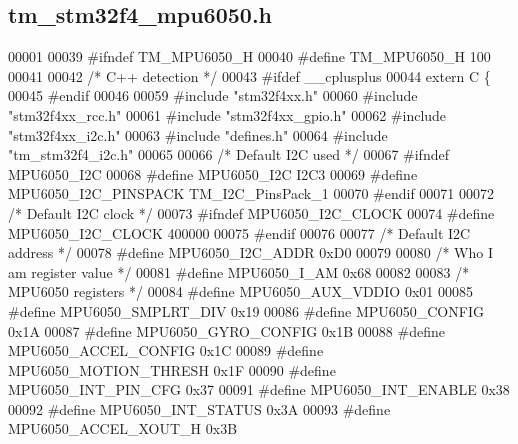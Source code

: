 \hypertarget{tm__stm32f4__mpu6050_8h_source}{}\subsection{tm\+\_\+stm32f4\+\_\+mpu6050.\+h}

\begin{DoxyCode}
00001 
00039 \textcolor{preprocessor}{#ifndef TM\_MPU6050\_H}
00040 \textcolor{preprocessor}{#define TM\_MPU6050\_H 100}
00041 
00042 \textcolor{comment}{/* C++ detection */}
00043 \textcolor{preprocessor}{#ifdef \_\_cplusplus}
00044 \textcolor{keyword}{extern} C \{
00045 \textcolor{preprocessor}{#endif}
00046 
00059 \textcolor{preprocessor}{#include "stm32f4xx.h"}
00060 \textcolor{preprocessor}{#include "stm32f4xx\_rcc.h"}
00061 \textcolor{preprocessor}{#include "stm32f4xx\_gpio.h"}
00062 \textcolor{preprocessor}{#include "stm32f4xx\_i2c.h"}
00063 \textcolor{preprocessor}{#include "defines.h"}
00064 \textcolor{preprocessor}{#include "tm\_stm32f4\_i2c.h"}
00065 
00066 \textcolor{comment}{/* Default I2C used */}
00067 \textcolor{preprocessor}{#ifndef MPU6050\_I2C}
00068 \textcolor{preprocessor}{#define MPU6050\_I2C                 I2C3}
00069 \textcolor{preprocessor}{#define MPU6050\_I2C\_PINSPACK        TM\_I2C\_PinsPack\_1}
00070 \textcolor{preprocessor}{#endif}
00071 
00072 \textcolor{comment}{/* Default I2C clock */}
00073 \textcolor{preprocessor}{#ifndef MPU6050\_I2C\_CLOCK}
00074 \textcolor{preprocessor}{#define MPU6050\_I2C\_CLOCK           400000}
00075 \textcolor{preprocessor}{#endif}
00076 
00077 \textcolor{comment}{/* Default I2C address */}
00078 \textcolor{preprocessor}{#define MPU6050\_I2C\_ADDR            0xD0}
00079 
00080 \textcolor{comment}{/* Who I am register value */}
00081 \textcolor{preprocessor}{#define MPU6050\_I\_AM                0x68}
00082 
00083 \textcolor{comment}{/* MPU6050 registers */}
00084 \textcolor{preprocessor}{#define MPU6050\_AUX\_VDDIO           0x01}
00085 \textcolor{preprocessor}{#define MPU6050\_SMPLRT\_DIV          0x19}
00086 \textcolor{preprocessor}{#define MPU6050\_CONFIG              0x1A}
00087 \textcolor{preprocessor}{#define MPU6050\_GYRO\_CONFIG         0x1B}
00088 \textcolor{preprocessor}{#define MPU6050\_ACCEL\_CONFIG        0x1C}
00089 \textcolor{preprocessor}{#define MPU6050\_MOTION\_THRESH       0x1F}
00090 \textcolor{preprocessor}{#define MPU6050\_INT\_PIN\_CFG         0x37}
00091 \textcolor{preprocessor}{#define MPU6050\_INT\_ENABLE          0x38}
00092 \textcolor{preprocessor}{#define MPU6050\_INT\_STATUS          0x3A}
00093 \textcolor{preprocessor}{#define MPU6050\_ACCEL\_XOUT\_H        0x3B}

\end{DoxyCode}
